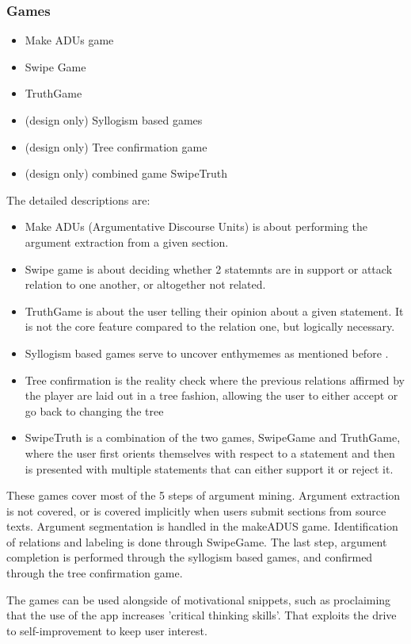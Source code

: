 \documentclass{report}
\begin{document}
{\subsubsection{Games}
\begin{itemize}
  \item Make ADUs game
  \item Swipe Game
  \item TruthGame 
  \item (design only) Syllogism based games
  \item (design only) Tree confirmation game
  \item (design only) combined game SwipeTruth
\end{itemize}
The detailed descriptions are:
\begin{itemize}
  \item Make ADUs (Argumentative Discourse Units) is about performing the argument extraction from a given section.
  \item Swipe game is about deciding whether 2 statemnts are in support or attack relation to one another, or altogether not related.
  \item TruthGame is about the user telling their opinion about a given statement. It is not the core feature compared to the relation one, but logically necessary.
  \item Syllogism based games serve to uncover enthymemes as mentioned before \cite{noauthor_finding_nodate}. 
  \item Tree confirmation is the reality check where the previous relations affirmed by the player are laid out in a tree fashion, allowing the user to either accept or go back to changing the tree
  \item SwipeTruth is a combination of the two games, SwipeGame and TruthGame, where the user first orients themselves with respect to a statement and then is presented with multiple statements that can either support it or reject it.
\end{itemize}

These games cover most of the 5 steps of argument mining. 
Argument extraction is not covered, or is covered implicitly when users submit sections from source texts. Argument segmentation is handled in the makeADUS game. Identification of relations and labeling is done through SwipeGame. The last step, argument completion is performed through the syllogism based games, and confirmed through the tree confirmation game.

The games can be used alongside of motivational snippets, such as proclaiming that the use of the app increases 'critical thinking skills'. 
That exploits the drive to self-improvement to keep user interest.

}
\end{document}
